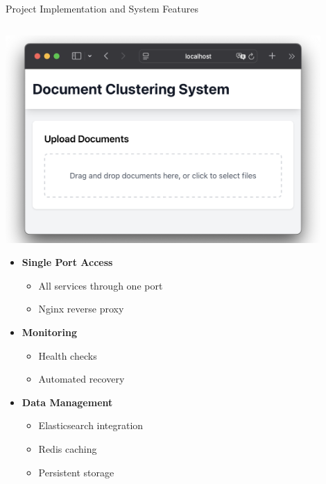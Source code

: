 \documentclass[notes]{beamer}
\begin{document}
{\begin{frame}[fragile]{Project Implementation and System Features}
\begin{columns}[T]
        \begin{column}{0.48\textwidth}
            \includegraphics[width=0.9\textwidth,height=0.7\textheight,keepaspectratio]{app_screenshot.png}

            \begin{itemize}
                \item \textbf{Single Port Access}
                \begin{itemize}
                    \item All services through one port
                    \item Nginx reverse proxy
                \end{itemize}
                \item \textbf{Monitoring}
                \begin{itemize}
                    \item Health checks
                    \item Automated recovery
                \end{itemize}
                \item \textbf{Data Management}
                \begin{itemize}
                    \item Elasticsearch integration
                    \item Redis caching
                    \item Persistent storage
                \end{itemize}
            \end{itemize}
        \end{column}
    \end{columns}
\end{frame}
}
\end{document}
